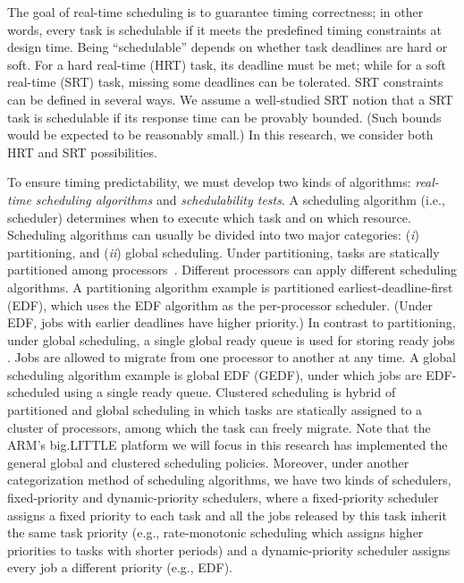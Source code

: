 The goal of real-time scheduling is to guarantee timing correctness; in other words, every task is schedulable if it meets the predefined timing constraints at design time. Being ``schedulable'' depends on whether task deadlines are hard or soft. %
For a hard real-time (HRT) task, its deadline must be met; while for a soft real-time (SRT) task, missing some deadlines can be tolerated. %
 SRT constraints can be defined in several ways. We assume a well-studied SRT notion \cite{mills2010stochastic, erickson2012soft, johndissertation, BBBdissertation, devidissertation, leontyevdissertation} that a SRT task is schedulable if its response time can be provably bounded. (Such bounds would be expected to be reasonably small.) In this research, we consider both HRT and SRT possibilities.  

To ensure timing predictability, we must develop two kinds of algorithms: \textit{real-time scheduling algorithms} and \textit{schedulability tests}. A scheduling algorithm (i.e., scheduler) determines when to execute which task and on which resource. Scheduling algorithms can usually be divided into two major categories: (\textit{i}) partitioning, and (\textit{ii}) global scheduling. %
Under partitioning, tasks are statically partitioned among processors~\cite{andersson2003, baker2007, funk2005, Baruah2006a, chattopadhyay2011, baruah2005a}. %
Different processors can apply different scheduling algorithms. A partitioning algorithm example is partitioned earliest-deadline-first (EDF), which uses the EDF algorithm as the per-processor scheduler. (Under EDF, jobs with earlier deadlines have higher priority.) In contrast to partitioning, under global scheduling, a single global ready queue is used for storing ready jobs \cite{baruah2008, bertogna2011b, BC, devi2005}. Jobs are allowed to migrate from one processor to another at any time. A global scheduling algorithm example is global EDF (GEDF), under which jobs are EDF-scheduled using a single ready queue. 
 Clustered scheduling is hybrid of partitioned and global scheduling in which tasks are statically assigned to a cluster of processors, among which the task can freely migrate.
 Note that the ARM's big.LITTLE platform we will focus in this research has implemented the general global and clustered scheduling policies. Moreover, under another categorization method of scheduling algorithms, we have two kinds of schedulers, fixed-priority and dynamic-priority schedulers, where a fixed-priority scheduler assigns a fixed priority to each task and all the jobs released by this task inherit the same task priority (e.g., rate-monotonic scheduling which assigns higher priorities to tasks with shorter periods) and a dynamic-priority scheduler assigns every job a different priority (e.g., EDF).
 

